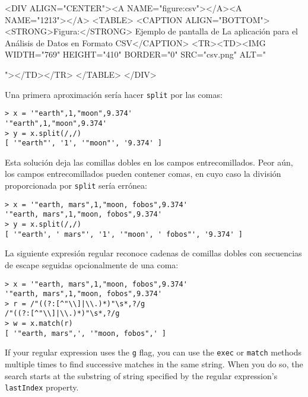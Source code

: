 \begin{rawhtml}
<DIV ALIGN="CENTER"><A NAME="figure:csv"></A><A NAME="1213"></A>
<TABLE>
<CAPTION ALIGN="BOTTOM"><STRONG>Figura:</STRONG>
Ejemplo de pantalla de La aplicación para el Análisis de Datos en Formato CSV</CAPTION>
<TR><TD><IMG
 WIDTH="769" HEIGHT="410" BORDER="0"
 SRC="csv.png"
 ALT="\begin{figure}\begin{center}
\centerline{}
\end{center}
\end{figure}"></TD></TR>
</TABLE>
</DIV>
\end{rawhtml}



Una primera aproximación sería hacer \verb|split| por las comas:
\begin{verbatim}
> x = '"earth",1,"moon",9.374'
'"earth",1,"moon",9.374'
> y = x.split(/,/)
[ '"earth"', '1', '"moon"', '9.374' ]
\end{verbatim}

Esta solución deja las comillas dobles en los campos entrecomillados. 
Peor aún, los campos entrecomillados pueden contener comas, en cuyo 
caso la división proporcionada por \verb|split| sería errónea:
\begin{verbatim}
> x = '"earth, mars",1,"moon, fobos",9.374'
'"earth, mars",1,"moon, fobos",9.374'
> y = x.split(/,/)
[ '"earth', ' mars"', '1', '"moon', ' fobos"', '9.374' ]
\end{verbatim}

La siguiente expresión regular reconoce cadenas de comillas dobles
con secuencias de escape seguidas opcionalmente de una coma:
\begin{verbatim}
> x = '"earth, mars",1,"moon, fobos",9.374'
'"earth, mars",1,"moon, fobos",9.374'
> r = /"((?:[^"\\]|\\.)*)"\s*,?/g
/"((?:[^"\\]|\\.)*)"\s*,?/g
> w = x.match(r)
[ '"earth, mars",', '"moon, fobos",' ]
\end{verbatim}
If your regular expression uses the \verb"g" flag, you can use the \verb|exec| 
or \verb|match| methods
multiple times to find successive matches in the same string. When
you do so, the search starts at the substring of string specified by the
regular expression's \verb|lastIndex| property.

